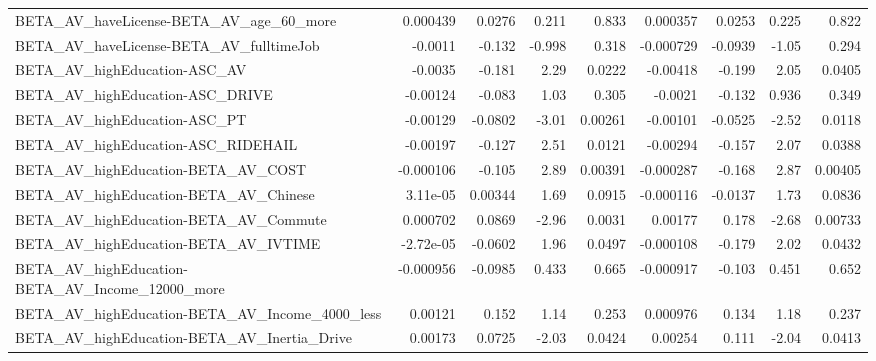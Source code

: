 \begin{tabular}{lrrrrrrrr}
BETA\_AV\_haveLicense-BETA\_AV\_age\_60\_more            &    0.000439 &       0.0276 &    0.211 &    0.833 &   0.000357 &      0.0253 &        0.225 &         0.822 \\
BETA\_AV\_haveLicense-BETA\_AV\_fulltimeJob            &     -0.0011 &       -0.132 &   -0.998 &    0.318 &  -0.000729 &     -0.0939 &        -1.05 &         0.294 \\
BETA\_AV\_highEducation-ASC\_AV                       &     -0.0035 &       -0.181 &     2.29 &   0.0222 &   -0.00418 &      -0.199 &         2.05 &        0.0405 \\
BETA\_AV\_highEducation-ASC\_DRIVE                    &    -0.00124 &       -0.083 &     1.03 &    0.305 &    -0.0021 &      -0.132 &        0.936 &         0.349 \\
BETA\_AV\_highEducation-ASC\_PT                       &    -0.00129 &      -0.0802 &    -3.01 &  0.00261 &   -0.00101 &     -0.0525 &        -2.52 &        0.0118 \\
BETA\_AV\_highEducation-ASC\_RIDEHAIL                 &    -0.00197 &       -0.127 &     2.51 &   0.0121 &   -0.00294 &      -0.157 &         2.07 &        0.0388 \\
BETA\_AV\_highEducation-BETA\_AV\_COST                 &   -0.000106 &       -0.105 &     2.89 &  0.00391 &  -0.000287 &      -0.168 &         2.87 &       0.00405 \\
BETA\_AV\_highEducation-BETA\_AV\_Chinese              &    3.11e-05 &      0.00344 &     1.69 &   0.0915 &  -0.000116 &     -0.0137 &         1.73 &        0.0836 \\
BETA\_AV\_highEducation-BETA\_AV\_Commute              &    0.000702 &       0.0869 &    -2.96 &   0.0031 &    0.00177 &       0.178 &        -2.68 &       0.00733 \\
BETA\_AV\_highEducation-BETA\_AV\_IVTIME               &   -2.72e-05 &      -0.0602 &     1.96 &   0.0497 &  -0.000108 &      -0.179 &         2.02 &        0.0432 \\
BETA\_AV\_highEducation-BETA\_AV\_Income\_12000\_more    &   -0.000956 &      -0.0985 &    0.433 &    0.665 &  -0.000917 &      -0.103 &        0.451 &         0.652 \\
BETA\_AV\_highEducation-BETA\_AV\_Income\_4000\_less     &     0.00121 &        0.152 &     1.14 &    0.253 &   0.000976 &       0.134 &         1.18 &         0.237 \\
BETA\_AV\_highEducation-BETA\_AV\_Inertia\_Drive        &     0.00173 &       0.0725 &    -2.03 &   0.0424 &    0.00254 &       0.111 &        -2.04 &        0.0413 \\

\end{tabular}

